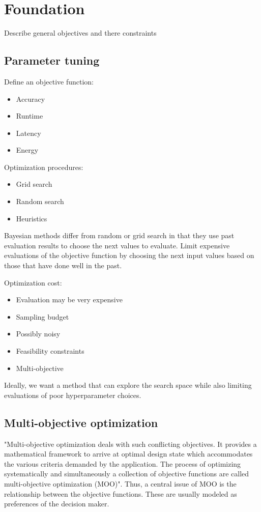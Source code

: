 \chapter{Foundation}
    Describe general objectives and there constraints

    \section{Parameter tuning}
        Define an objective function: 
        \begin{itemize}
            \item Accuracy
            \item Runtime
            \item Latency
            \item Energy
        \end{itemize}

        Optimization procedures:
        \begin{itemize}
            \item Grid search
            \item Random search
            \item Heuristics
        \end{itemize}
        Bayesian methods differ from random or grid search in that they use past evaluation results to choose the next values to evaluate.
        Limit expensive evaluations of the objective function by choosing the next input values based on those that have done well in the past.

        Optimization cost:
        \begin{itemize}
            \item Evaluation may be very expensive
            \item Sampling budget
            \item Possibly noisy
            \item Feasibility constraints
            \item Multi-objective
        \end{itemize}
        Ideally, we want a method that can explore the search space while also limiting evaluations of poor hyperparameter choices.

    
    \section{Multi-objective optimization}
        "Multi-objective optimization deals with such conflicting objectives. It provides a
        mathematical framework to arrive at optimal design state which accommodates the various criteria demanded by
        the application. The process of optimizing systematically and simultaneously a collection of objective functions
        are called multi-objective optimization (MOO)\cite{odugod2013}".
        Thus, a central issue of MOO is the relationship between the objective functions. These are usually modeled as preferences of the decision maker.

